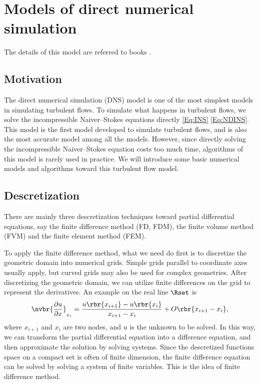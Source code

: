 \documentclass[english, nochinese]{pkupaper}
\begin{document}

\section{Models of direct numerical simulation} \label{Sec:DNS}

The details of this model are referred to books \parencite{forsythe_finite-difference_1960} \parencite{ferziger_computational_2002}.

\subsection{Motivation}

The direct numerical simulation (DNS) model is one of the most simplest models in simulating turbulent flows. To simulate what happens in turbulent flows, we solve the incompressible Naiver--Stokes equations directly \eqref{Eq:INS} \eqref{Eq:NDINS}. This model is the first model developed to simulate turbulent flows, and is also the most accurate model among all the models. However, since directly solving the incompressible Naiver--Stokes equation costs too much time, algorithms of this model is rarely used in practice. We will introduce some basic numerical models and algorithms toward this turbulent flow model.

\subsection{Descretization}

There are mainly three descretization techniques toward partial differential equations, say the finite difference method (FD, FDM), the finite volume method (FVM) and the finite element method (FEM).

To apply the finite difference method, what we need do first is to discretize the geometric domain into numerical grids. Simple grids parallel to coordinate axes usually apply, but curved grids may also be used for complex geometries. After discretizing the geometric domain, we can utilize finite differences on the grid to represent the derivatives. An example on the real line $\Rset$ is
\begin{equation}
\nvbr{\frac{\partial u}{\partial x}}_{x_i} = \frac{u\rbr{x_{i+1}} - u\rbr{x_i}}{x_{i+1} - x_i} + O \rbr{ x_{ i + 1 } - x_i },
\end{equation}
where $x_{i+1}$ and $x_i$ are two nodes, and $u$ is the unknown to be solved. In this way, we can transform the partial differential equation into a difference equation, and then approximate the solution by solving systems. Since the descretized functions space on a compact set is often of finite dimension, the finite difference equation can be solved by solving a system of finite variables. This is the idea of finite difference method.
\end{document}
